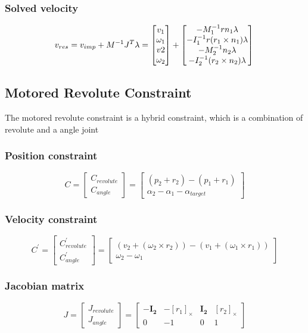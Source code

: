 \documentclass{article}
\begin{document}
		\subsubsection{Solved velocity}
		$$
			v_{res}=v_{imp}+M^{-1}J^T\lambda=
			\begin{bmatrix}
				v_1\\
				\omega_1\\
				v2\\
				\omega_2
			\end{bmatrix}
			+
			\begin{bmatrix}
				-M_1^{-1}rn_1\lambda\\
				-I_1^{-1}r(r_1 \times n_1)\lambda\\
				-M_2^{-1}n_2\lambda\\
				-I_2^{-1}(r_2 \times n_2)\lambda
			\end{bmatrix}\\
		$$
	\newpage
	\subsection{Motored Revolute Constraint}
	The motored revolute constraint is a hybrid constraint, which is a combination of revolute and a angle joint
	\subsubsection{Position constraint}
		$$
			C=
				\begin{bmatrix}
					C_{revolute}\\
					C_{angle}
				\end{bmatrix}
			=
				\begin{bmatrix}
					(p_2+r_2)-(p_1+r_1)\\
					\alpha_2-\alpha_1-\alpha_{target}
					\end{bmatrix}
		$$
	\subsubsection{Velocity constraint}
		$$
			C^{'}=
				\begin{bmatrix}
					C_{revolute}^{'}\\
					C_{angle}^{'}
				\end{bmatrix}
				=
				\begin{bmatrix}
					(v_2+(\omega_2\times r_2))-(v_1+(\omega_1\times r_1))\\
					\omega_2-\omega_1
				\end{bmatrix}
		$$
	\subsubsection{Jacobian matrix}
		$$
			J=
				\begin{bmatrix}
					J_{revolute}\\
					J_{angle}
				\end{bmatrix}
				=
				\begin{bmatrix}
					-\boldsymbol{I_2} & -[r_1]_\times & \boldsymbol{I_2} & [r_2]_\times\\
					0 & -1 & 0 & 1
				\end{bmatrix}
		$$
\end{document}

